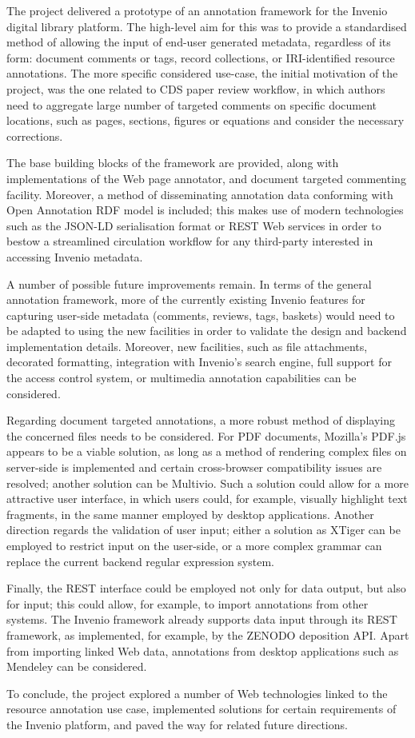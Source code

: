
The project delivered a prototype of an annotation framework for the Invenio
digital library platform. The high-level aim for this was to provide a
standardised method of allowing the input of end-user generated metadata,
regardless of its form: document comments or tags, record collections, or
IRI-identified resource annotations. The more specific considered use-case, the
initial motivation of the project, was the one related to CDS paper review
workflow, in which authors need to aggregate large number of targeted comments
on specific document locations, such as pages, sections, figures or equations and
consider the necessary corrections.

The base building blocks of the framework are provided, along with
implementations of the Web page annotator, and document targeted commenting
facility. Moreover, a method of disseminating annotation data conforming with
Open Annotation RDF model is included; this makes use of modern
technologies such as the JSON-LD serialisation format or REST Web services in
order to bestow a streamlined circulation workflow for any third-party
interested in accessing Invenio metadata.

A number of possible future improvements remain. In terms of the general
annotation framework, more of the currently existing Invenio features for
capturing user-side metadata (comments, reviews, tags, baskets) would need to
be adapted to using the new facilities in order to validate the design and
backend implementation details. Moreover, new facilities, such as file
attachments, decorated formatting, integration with Invenio's search engine,
full support for the access control system, or multimedia annotation
capabilities can be considered.

Regarding document targeted annotations, a more robust method of displaying the
concerned files needs to be considered. For PDF documents, Mozilla's PDF.js
appears to be a viable solution, as long as a method of rendering complex files
on server-side is implemented and certain cross-browser compatibility issues
are resolved; another solution can be Multivio. Such a solution could allow for
a more attractive user interface, in which users could, for example, visually
highlight text fragments, in the same manner employed by desktop applications.
Another direction regards the validation of user input; either a solution as
XTiger can be employed to restrict input on the user-side, or a more complex
grammar can replace the current backend regular expression system.

Finally, the REST  interface could be employed not only for data output, but
also for input; this could allow, for example, to import annotations from other
systems. The Invenio framework already supports data input through its REST
framework, as implemented, for example, by the ZENODO deposition API. Apart
from importing linked Web  data, annotations from desktop applications such as
Mendeley can be considered.

To conclude, the project explored a number of Web technologies linked to the
resource annotation use case, implemented solutions for certain requirements of
the Invenio platform, and paved the way for related future directions.

